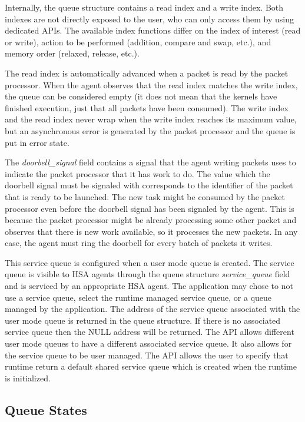 \documentclass[draft]{book}
\newcommand{\reffld}[1]{\textit{#1}}
\newcommand{\mariotodo}[1]{\todo[color=CarnationPink]{#1}}
\begin{document}
Internally, the queue structure contains a read index and a write index. Both
indexes are not directly exposed to the user, who can only access them by using
dedicated APIs.  The available index functions differ on the index of interest
(read or write), action to be performed (addition, compare and swap, etc.), and
memory order (relaxed, release, etc.).

The read index is automatically advanced when a packet is read by the packet
processor. When the agent observes that the read index matches the write index,
the queue can be considered empty (it does not mean that the kernels have
finished execution, just that all packets have been consumed). The write index
and the read index never wrap when the write index reaches its maximum value,
but an asynchronous error is generated by the packet processor and the queue is
put in error state.

The \reffld{doorbell_signal} field contains a signal that the agent writing
packets uses to indicate the packet processor that it has work to do. The value
which the doorbell signal must be signaled with corresponds to the identifier of
the packet that is ready to be launched.  The new task might be consumed by the
packet processor even before the doorbell signal has been signaled by the
agent. This is because the packet processor might be already processing some
other packet and observes that there is new work available, so it processes the
new packets. In any case, the agent must ring the doorbell for every batch of
packets it writes.

\mariotodo{clarify service queues}This service queue is configured when a user
mode queue is created. The service queue is visible to HSA agents through the
queue structure \reffld{service_queue} field and is serviced by an appropriate
HSA agent. The application may chose to not use a service queue, select the
runtime managed service queue, or a queue managed by the application. The
address of the service queue associated with the user mode queue is returned in
the queue structure. If there is no associated service queue then the NULL
address will be returned. The API allows different user mode queues to have a
different associated service queue. It also allows for the service queue to be
user managed. The API allows the user to specify that runtime return a default
shared service queue which is created when the runtime is initialized.

\hypertarget{queue-errors}{}\subsection{Queue States} \label{queue-errors}
\end{document}
